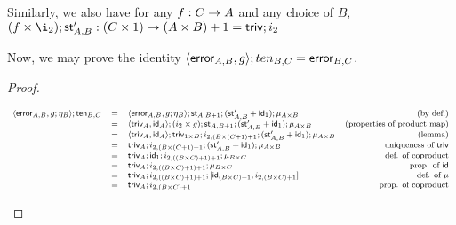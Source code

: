 \documentclass{article}[12pt]
\begin{document}
Similarly, we also have for any $f : C \rightarrow A$ and any
choice of $B$, $(f \times \i_2) ; \st^{\prime}_{A,B} : (C \times 1) \mto (A \times B) + 1 = \triv ; i_2$

Now, we may prove the identity $\langle \mathsf{error}_{A,B}, g \rangle ; ten_{B,C} = \mathsf{error}_{B,C}$.
\begin{proof}
  \begin{center}
    \begin{math} \footnotesize
    \begin{array}{rllr}
      \langle \mathsf{error}_{A,B}, g; \eta_B \rangle ; \mathsf{ten}_{B,C} & = & \langle \mathsf{error}_{A,B}, g; \eta_B \rangle ; \mathsf{st}_{A,B+1} ; (\mathsf{st}^{\prime}_{A,B} + \mathsf{id}_1); \mu_{A \times B} & \text{(by def.)} \\
      & = & \langle \mathsf{triv}_A, \mathsf{id}_A \rangle ; (i_2 \times g); \mathsf{st}_{A,B+1} ; (\mathsf{st}^{\prime}_{A,B} + \mathsf{id}_1); \mu_{A \times B} & \text{(properties of product map)} \\
      & = & \langle \mathsf{triv}_A, \mathsf{id}_A \rangle ; \mathsf{triv}_{1 \times B} ; i_{2,(B \times (C + 1) + 1} ; (\mathsf{st}^{\prime}_{A,B} + \mathsf{id}_1); \mu_{A \times B} & \text{(lemma)} \\
      & = & \mathsf{triv}_A ; i_{2,(B \times (C + 1) + 1} ; (\mathsf{st}^{\prime}_{A,B} + \mathsf{id}_1); \mu_{A \times B} & \text{ uniqueness of } \mathsf{triv} \\
      & = & \mathsf{triv}_A ; \mathsf{id}_1 ; i_{2,((B \times C) + 1) + 1} ; \mu_{B \times C} & \text{def. of coproduct} \\
      & = & \mathsf{triv}_A ; i_{2,((B \times C) + 1) + 1} ; \mu_{B \times C} & \text{prop. of } \mathsf{id} \\
      & = & \mathsf{triv}_A ; i_{2,((B \times C) + 1) + 1} ; [\mathsf{id}_{(B \times C) + 1}, i_{2, (B \times C) + 1}] & \text{def. of } \mu \\
      & = & \mathsf{triv}_A ; i_{2, (B \times C) + 1} & \text{prop. of coproduct} \\
    \end{array}
    \end{math}
  \end{center}
\end{proof}
\end{document}
